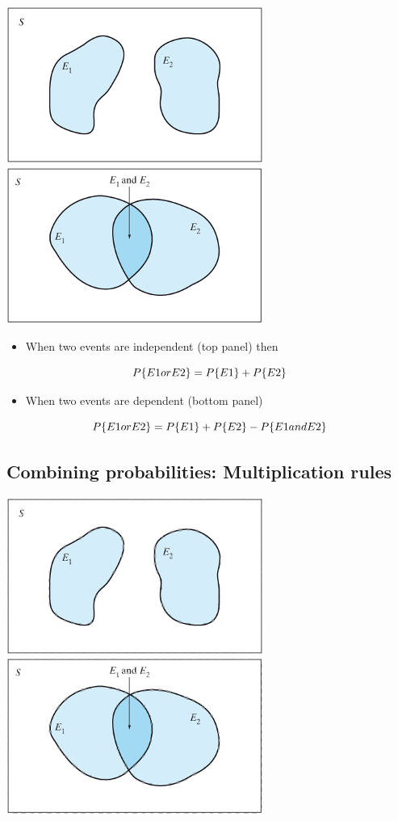 \documentclass[
]{book}
\providecommand{\tightlist}{%
  \setlength{\itemsep}{0pt}\setlength{\parskip}{0pt}}
\begin{document}
\includegraphics[width=0.5\linewidth]{./2_21a}
\includegraphics[width=0.5\linewidth]{./2_21b}

\begin{itemize}
\tightlist
\item
  When two events are independent (top panel) then
\end{itemize}

\[P\{E1 \space or \space E2\} = P\{E1\} + P\{E2\}\]

\begin{itemize}
\tightlist
\item
  When two events are dependent (bottom panel)
\end{itemize}

\[P\{E1 \space or \space E2\}  = P\{E1\} + P\{E2\} - P\{E1 \space and \space E2\}\]

\hypertarget{combining-probabilities-multiplication-rules}{%
\subsection{Combining probabilities: Multiplication rules}\label{combining-probabilities-multiplication-rules}}

\includegraphics[width=0.5\linewidth]{./2_22a}
\includegraphics[width=0.5\linewidth]{./2_22b}
\end{document}
